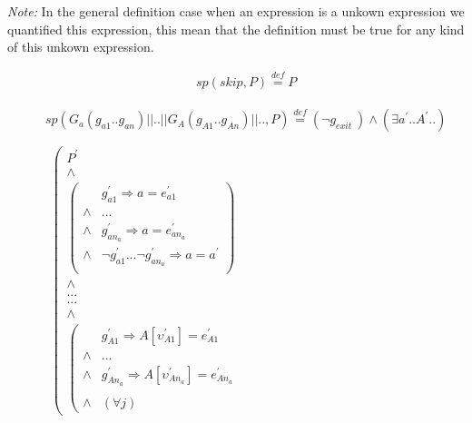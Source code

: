 \documentclass[a4paper,10pt]{article}
\newcommand{\p}[1]{\ensuremath{#1^{'}}\xspace}
\newcommand{\gexit}{\ensuremath{\mathit{g_{exit}~}}}
\newcommand{\group}[2]{\ensuremath{\mathit{G}_{#1}(#2)}\xspace}
\newcommand{\patternnote}{\noindent\textit{Note:}\xspace}
\newcommand{\symdef}{\ensuremath{\overset{\mathit{def}}{=}}}
\newcommand{\impl}{\ensuremath{\Longrightarrow}}
\newcommand{\spostsym}{\ensuremath{sp}\xspace}
\newcommand{\spost}[2]{\ensuremath{\spostsym(#1,#2)}}
\begin{document}
\patternnote
In the general definition case when an expression is a unkown expression we quantified 
this expression, this mean that the definition must be true for any kind of this unkown expression.

\begin{eqnarray*}
    && \spost{skip}{P} \symdef P  
\end{eqnarray*}

\begin{eqnarray*}
    && \spost{\group{a}{g_{a1} .. g_{an}} || .. || \group{A}{g_{A1} .. g_{An}} || ..}{P} \symdef 
   (\neg \gexit) \land (\exists \p{a}..\p{A}..)\\
    &&~~~\\
    &&\begin{array}{cc}  
        \left(\begin{array}{cc}
                \p{P}\\
                \land\\                             
                \left(\begin{array}{cc}
                & \p{g_{a1}} \impl a = \p{e_{a1}} \\
                \land & ...\\
                \land & \p{g_{an_a}} \impl a = \p{e_{an_a}}\\
                \land & \neg \p{g_{a1}} ... \neg \p{g_{an_a}} \impl a = \p{a}\\
              \end{array}\right)\\
              \land\\
              ...\\
              ...\\
              \land\\ 
              \left(\begin{array}{cc}
                & \p{g_{A1}} \impl A[\p{\upsilon_{A1}}] = \p{e_{A1}} \\
                \land & ...\\
                \land & \p{g_{An_a}} \impl A[\p{\upsilon_{An_a}}] = \p{e_{An_a}}\\
                &~~~~~~~~~~~~~~~~\\
                \land & (\forall j)

\end{array}
\end{array}
\end{array}
\end{eqnarray*}
\end{document}

